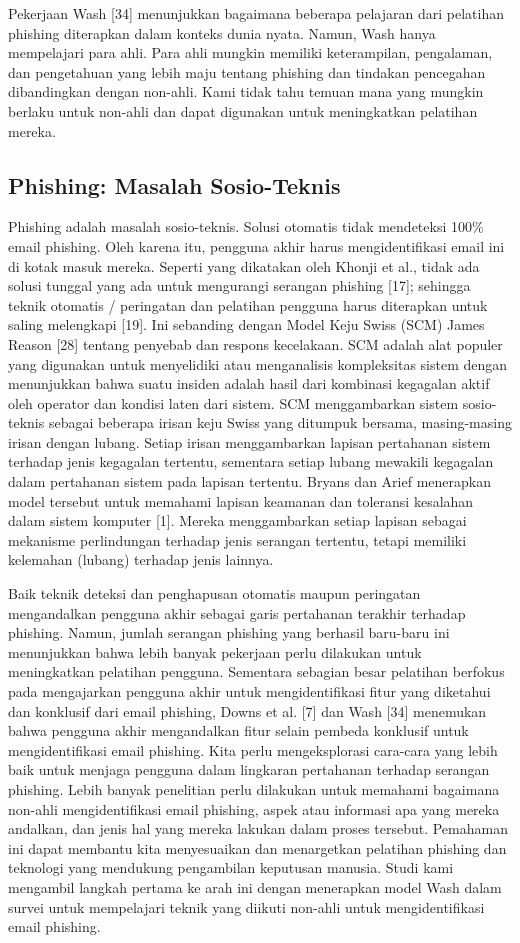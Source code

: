 \documentclass[lettersize,journal]{IEEEtran}
\begin{document}
Pekerjaan Wash [34] menunjukkan bagaimana beberapa pelajaran dari pelatihan
phishing diterapkan dalam konteks dunia nyata. Namun, Wash hanya mempelajari
para ahli. Para ahli mungkin memiliki keterampilan, pengalaman, dan pengetahuan
yang lebih maju tentang phishing dan tindakan pencegahan dibandingkan dengan
non-ahli. Kami tidak tahu temuan mana yang mungkin berlaku untuk non-ahli dan
dapat digunakan untuk meningkatkan pelatihan mereka.

\subsection{Phishing: Masalah Sosio-Teknis}

Phishing adalah masalah sosio-teknis. Solusi otomatis tidak mendeteksi 100\%
email phishing. Oleh karena itu, pengguna akhir harus mengidentifikasi email
ini di kotak masuk mereka. Seperti yang dikatakan oleh Khonji et al., tidak ada
solusi tunggal yang ada untuk mengurangi serangan phishing [17]; sehingga
teknik otomatis / peringatan dan pelatihan pengguna harus diterapkan untuk
saling melengkapi [19]. Ini sebanding dengan Model Keju Swiss (SCM) James
Reason [28] tentang penyebab dan respons kecelakaan. SCM adalah alat populer
yang digunakan untuk menyelidiki atau menganalisis kompleksitas sistem dengan
menunjukkan bahwa suatu insiden adalah hasil dari kombinasi kegagalan aktif
oleh operator dan kondisi laten dari sistem. SCM menggambarkan sistem
sosio-teknis sebagai beberapa irisan keju Swiss yang ditumpuk bersama,
masing-masing irisan dengan lubang. Setiap irisan menggambarkan lapisan
pertahanan sistem terhadap jenis kegagalan tertentu, sementara setiap lubang
mewakili kegagalan dalam pertahanan sistem pada lapisan tertentu. Bryans dan
Arief menerapkan model tersebut untuk memahami lapisan keamanan dan toleransi
kesalahan dalam sistem komputer [1]. Mereka menggambarkan setiap lapisan
sebagai mekanisme perlindungan terhadap jenis serangan tertentu, tetapi
memiliki kelemahan (lubang) terhadap jenis lainnya.

Baik teknik deteksi dan penghapusan otomatis maupun peringatan mengandalkan
pengguna akhir sebagai garis pertahanan terakhir terhadap phishing. Namun,
jumlah serangan phishing yang berhasil baru-baru ini menunjukkan bahwa lebih
banyak pekerjaan perlu dilakukan untuk meningkatkan pelatihan pengguna.
Sementara sebagian besar pelatihan berfokus pada mengajarkan pengguna akhir
untuk mengidentifikasi fitur yang diketahui dan konklusif dari email phishing,
Downs et al. [7] dan Wash [34] menemukan bahwa pengguna akhir mengandalkan
fitur selain pembeda konklusif untuk mengidentifikasi email phishing. Kita
perlu mengeksplorasi cara-cara yang lebih baik untuk menjaga pengguna dalam
lingkaran pertahanan terhadap serangan phishing. Lebih banyak penelitian perlu
dilakukan untuk memahami bagaimana non-ahli mengidentifikasi email phishing,
aspek atau informasi apa yang mereka andalkan, dan jenis hal yang mereka
lakukan dalam proses tersebut. Pemahaman ini dapat membantu kita menyesuaikan
dan menargetkan pelatihan phishing dan teknologi yang mendukung pengambilan
keputusan manusia. Studi kami mengambil langkah pertama ke arah ini dengan
menerapkan model Wash dalam survei untuk mempelajari teknik yang diikuti
non-ahli untuk mengidentifikasi email phishing.
\end{document}
